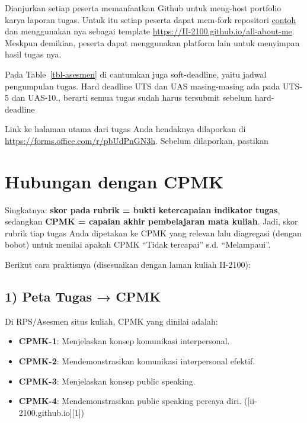 \documentclass[
  letterpaper,
  DIV=11,
  numbers=noendperiod]{scrreprt}
\providecommand{\tightlist}{%
  \setlength{\itemsep}{0pt}\setlength{\parskip}{0pt}}
\begin{document}
Dianjurkan setiap peserta memanfaatkan Github untuk meng-host portfolio
karya laporan tugas. Untuk itu setiap peserta dapat mem-fork repositori
\href{https://github.com/II-2100/all-about-me}{contoh} dan menggunakan
nya sebagai template \url{https://II-2100.github.io/all-about-me}.
Meskpun demikian, peserta dapat menggunakan platform lain untuk
menyimpan hasil tugas nya.

Pada Table~\ref{tbl-asesmen} di cantumkan juga soft-deadline, yaitu
jadwal pengumpulan tugas. Hard deadline UTS dan UAS masing-masing ada
pada UTS-5 dan UAS-10., berarti semua tugas sudah harus tersubmit
sebelum hard-deadline

Link ke halaman utama dari tugas Anda hendaknya dilaporkan di
\url{https://forms.office.com/r/pbUdPnGN3h}. Sebelum dilaporkan,
pastikan

\section*{Hubungan dengan CPMK}\label{hubungan-dengan-cpmk}


Singkatnya: \textbf{skor pada rubrik = bukti ketercapaian indikator
tugas}, sedangkan \textbf{CPMK = capaian akhir pembelajaran mata
kuliah}. Jadi, skor rubrik tiap tugas Anda dipetakan ke CPMK yang
relevan lalu diagregasi (dengan bobot) untuk menilai apakah CPMK ``Tidak
tercapai'' s.d. ``Melampaui''.

Berikut cara praktisnya (disesuaikan dengan laman kuliah II-2100):

\subsection*{1) Peta Tugas → CPMK}\label{peta-tugas-cpmk}

Di RPS/Asesmen situs kuliah, CPMK yang dinilai adalah:

\begin{itemize}
\tightlist
\item
  \textbf{CPMK-1}: Menjelaskan konsep komunikasi interpersonal.
\item
  \textbf{CPMK-2}: Mendemonstrasikan komunikasi interpersonal efektif.
\item
  \textbf{CPMK-3}: Menjelaskan konsep public speaking.
\item
  \textbf{CPMK-4}: Mendemonstrasikan public speaking percaya diri.
  ({[}ii-2100.github.io{]}{[}1{]})
\end{itemize}
\end{document}

